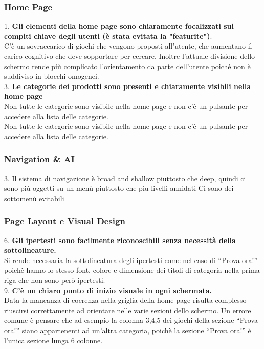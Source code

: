 \documentclass[../Report.tex]{subfiles}
\begin{document}
    \subsubsection{Home Page}
        1. \textbf{ Gli elementi della home page sono chiaramente focalizzati sui compiti chiave degli utenti (è stata evitata la "featurite")}.\\
        C’è un sovraccarico di giochi che vengono proposti all’utente, che aumentano il carico cognitivo che deve sopportare per cercare. Inoltre l’attuale divisione dello schermo rende più complicato l’orientamento da parte dell’utente poiché non è suddiviso in blocchi omogenei.\\

        3. \textbf{Le categorie dei prodotti sono presenti e chiaramente visibili nella home page}\\
        Non tutte le categorie sono visibile nella home page e non c’è un pulsante per accedere alla lista delle categorie.
\\ Non tutte le categorie sono visibile nella home page e non c’è un pulsante per accedere alla lista delle categorie.    
    \subsubsection{Navigation \& AI }
    3. Il sistema di navigazione è broad and shallow piuttosto che deep, quindi ci sono più oggetti su un menù piuttosto che piu livelli annidati  
 	Ci sono dei sottomenù evitabili 

    \subsubsection{Page Layout e Visual Design}
    6. \textbf{Gli ipertesti sono facilmente riconoscibili senza necessità della sottolineature. }\\
    Si rende necessaria la sottolineatura degli ipertesti come nel caso di “Prova ora!” poichè hanno lo stesso font, colore e dimensione dei titoli di categoria nella prima riga che non sono però ipertesti. \\

    9. \textbf{C’è un chiaro punto di inizio visuale in ogni schermata.}\\
    Data la mancanza di coerenza nella griglia della home page risulta complesso riuscirsi correttamente ad orientare nelle varie sezioni dello schermo. Un errore comune è pensare che ad esempio la colonna 3,4,5 dei giochi della sezione “Prova ora!” siano appartenenti ad un’altra categoria, poichè la sezione “Prova ora!” è l’unica sezione lunga 6 colonne.\\
\end{document}
